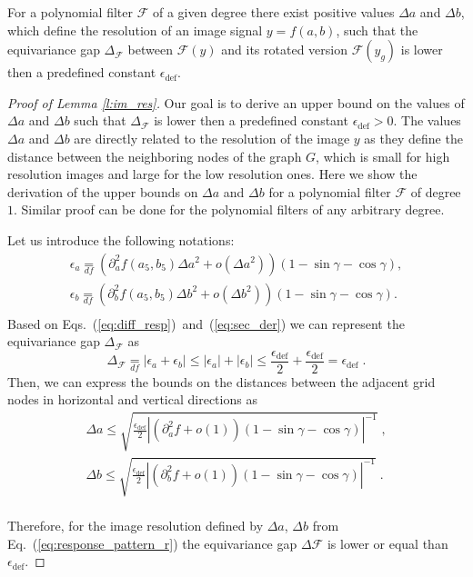 \documentclass[10pt,journal,compsoc]{IEEEtran}
\newcommand{\df}{\mathop{=}\limits_{df}}
\begin{document}
	\begin{lemma}
		For a polynomial filter $\mathcal{F}$ of a given degree there exist positive values $\Delta a$ and $\Delta b$, which define the resolution of an image signal $y=f(a,b)$, such that the equivariance gap $\Delta_\mathcal{F}$ between $\mathcal{F}(y)$ and its rotated version $\mathcal{F}(y_g)$ is lower then a predefined constant $\epsilon_\text{def}$.
		\label{l:im_res}
	\end{lemma}
	\begin{proof}[Proof of Lemma \ref{l:im_res}]
		Our goal is to derive an upper bound on the values of $\Delta a$ and $\Delta b$ such that $\Delta_\mathcal{F}$ is lower then a predefined constant $\epsilon_\text{def} > 0$. The values $\Delta a$ and $\Delta b$ are directly related to the resolution of the image $y$ as they define the distance between the neighboring nodes of the graph $G$, which is small for high resolution images and large for the low resolution ones. Here we show the derivation of the upper bounds on $\Delta a$ and $\Delta b$ for a polynomial filter $\mathcal{F}$ of degree $1$. Similar proof can be done for the polynomial filters of any arbitrary degree.

		Let us introduce the following notations:
		\begin{equation}
		\begin{aligned}
		\epsilon_a \df \left(\partial^2_a f (a_5,b_5) \Delta a^2 + o(\Delta a^2)\right)(1-\sin\gamma -\cos\gamma), \\
		\epsilon_b \df \left(\partial^2_b f (a_5,b_5) \Delta b^2 + o(\Delta b^2)\right)(1-\sin\gamma -\cos\gamma). \\
		\end{aligned}
		\end{equation}
		\noindent
		Based on Eqs.~(\ref{eq:diff_resp})~and~(\ref{eq:sec_der}) we can represent the equivariance gap $\Delta_\mathcal{F}$ as
		\begin{equation}
		\Delta_\mathcal{F} \df |\epsilon_a + \epsilon_b| \leq |\epsilon_a| + |\epsilon_b| \leq  \frac{\epsilon_\text{def}}{2} + \frac{\epsilon_\text{def}}{2} = \epsilon_\text{def} \;.
		\label{eq:cond_diff}
		\end{equation}
		\noindent
		Then, we can express the bounds on the distances between the adjacent grid nodes in horizontal and vertical directions as
		\begin{equation}
		\begin{aligned}
		\Delta a \leq \sqrt{\frac{\epsilon_\text{def}}{2} \left|\left(\partial^2_a f + o(1)\right)(1-\sin\gamma -\cos\gamma)\right|^{-1}}\;, \\
		\Delta b \leq \sqrt{\frac{\epsilon_\text{def}}{2} \left|\left(\partial^2_b f + o(1)\right)(1-\sin\gamma -\cos\gamma)\right|^{-1}}\;. \\
		\end{aligned}
		\label{eq:response_pattern_r}
		\end{equation}

		Therefore, for the image resolution defined by $\Delta a$, $\Delta b$ from Eq.~(\ref{eq:response_pattern_r}) the equivariance gap $\Delta \mathcal{F}$ is lower or equal than $\epsilon_\text{def}$.
	\end{proof}
\end{document}
